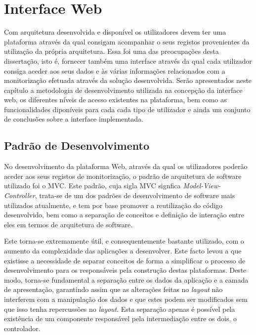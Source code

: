 \chapter{Interface Web}

Com arquitetura desenvolvida e disponível os utilizadores devem ter uma plataforma através da qual consigam acompanhar o seus registos provenientes da utilização da própria arquitetura. Essa foi uma das preocupações desta dissertação, isto é, fornecer também uma interface através da qual cada utilizador consiga aceder aos seus dados e às várias informações relacionados com a monitorização efetuada através da solução desenvolvida. Serão apresentados neste capítulo a metodologia de desenvolvimento utilizada na concepção da interface web, os diferentes níveis de acesso existentes na plataforma, bem como as funcionalidades diponíveis para cada cada tipo de utilizador e ainda um conjunto de conclusões sobre a interface implementada.

\section{Padrão de Desenvolvimento}

No desenvolvimento da plataforma Web, através da qual os utilizadores poderão aceder aos seus registos de monitorização, o padrão de arquitetura de software utilizado foi o MVC. Este padrão, cuja sigla MVC signfica \textit{Model-View-Controller}, trata-se de um dos padrões de desenvolvimento de software mais utilizados atualmente, e tem por base promover a reutilização do código desenvolvido, bem como a separação de conceitos e definição de interação entre eles em termos de arquitetura de software.

Este torna-se extremamente útil, e consequentemente bastante utilizado, com o aumento da complexidade das aplicações a desenvolver. Este facto levou a que existisse a necessidade de separar conceitos de forma a simplificar o processo de desenvolvimento para os responsáveis pela construção destas plataformas. Deste modo, torna-se fundamental a separação entre os dados da aplicação e a camada de apresentação, garantindo assim que as alterações feitas no \textit{layout} não interferem com a manipulação dos dados e que estes podem ser modificados sem que isso tenha repercussões no \textit{layout}. Esta separação apenas é possível pela existência de um componente responsável pela intermediação entre os dois, o controlador.


